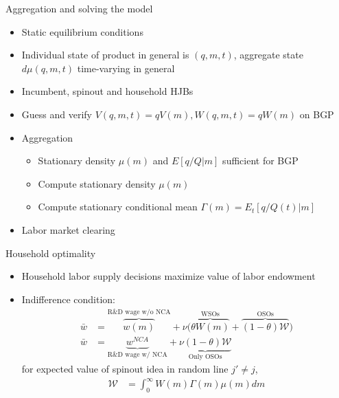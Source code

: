 \documentclass[english,usenames,dvipsnames]{beamer}
\begin{document}
\begin{frame}{Aggregation and solving the model}\label{closing_the_model}
\small
\begin{itemize}
\item Static equilibrium conditions \hyperlink{static_eq_conditions}{}
\item Individual state of product in general is $(q,m,t)$, aggregate state $d\mu(q,m,t)$ time-varying in general 
\item Incumbent, spinout and household HJBs \hyperlink{HJB_incumbent}{} \hyperlink{HJB_spinout}{} \hyperlink{HJB_household}{}
\item Guess and verify $V(q,m,t) = qV(m), W(q,m,t) = qW(m)$ on BGP \hyperlink{scaling_of_value_functions}{}
\item Aggregation 
\begin{itemize}
\item Stationary density $\mu(m)$ and $E[q/Q|m]$ sufficient for BGP \hyperlink{aggregate_distribution_and_bgp}{}
\item Compute stationary density $\mu(m)$  \hyperlink{aggregation}{}
\item Compute stationary conditional mean $\Gamma(m) = E_t[q/Q(t)|m]$ \hyperlink{aggregation}{}
\end{itemize}
\item Labor market clearing
\end{itemize}
\end{frame}

\begin{frame}{Household optimality}
\begin{itemize}
\item Household labor supply decisions maximize value of labor endowment
\item Indifference condition:
\begin{align*}  
\bar{w} &= \overbrace{w(m)}^{\textrm{R\&D wage w/o NCA}} + \nu \Big(\overbrace{\theta W(m)}^{\textrm{WSOs}} + \overbrace{(1-\theta) \mathcal{W}}^{\textrm{OSOs}} \Big) \\
\bar{w} &= \underbrace{w^{NCA}}_{\textrm{R\&D wage w/ NCA}} + \underbrace{\nu (1-\theta) \mathcal{W}}_{\textrm{Only OSOs}}
\end{align*}
for expected value of spinout idea in random line $j' \ne j$,
\begin{align*}
\mathcal{W} &= \int_0^{\infty} W(m) \Gamma(m) \mu(m) dm
\end{align*}
\end{itemize}
\end{frame}
\end{document}
